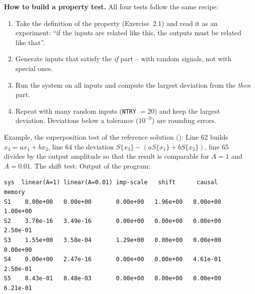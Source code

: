 \begin{solution}
\textbf{How to build a property test.} All four tests follow the same
recipe:
\begin{enumerate}[label=Step \arabic*:,leftmargin=*,itemsep=1pt]
  \item Take the definition of the property (Exercise~2.1) and read it as an
    experiment: ``if the inputs are related like this, the outputs must be
    related like that''.
  \item Generate inputs that satisfy the \emph{if} part -- with random
    signals, not with special ones.
  \item Run the system on all inputs and compute the largest deviation from
    the \emph{then} part.
  \item Repeat with many random inputs (\texttt{NTRY} $=20$) and keep the
    largest deviation. Deviations below a tolerance ($10^{-9}$) are rounding
    errors.
\end{enumerate}
Example, the superposition test of the reference solution
():
Line 62 builds $x_3=ax_1+bx_2$, line 64 the deviation
$S\{x_3\}-(aS\{x_1\}+bS\{x_2\})$, line 65 divides by the output amplitude so
that the result is comparable for $A=1$ and $A=0.01$. The shift test:
Output of the program:
\begin{lstlisting}[style=shell,numbers=none]
sys  linear(A=1) linear(A=0.01) imp-scale   shift      causal     memory
S1    0.00e+00   0.00e+00       0.00e+00   1.96e+00   0.00e+00   1.00e+00
S2    3.78e-16   3.49e-16       0.00e+00   0.00e+00   0.00e+00   2.50e-01
S3    1.55e+00   3.58e-04       1.29e+00   0.00e+00   0.00e+00   0.00e+00
S4    0.00e+00   2.47e-16       0.00e+00   0.00e+00   4.61e-01   2.50e-01
S5    8.43e-01   8.48e-03       0.00e+00   0.00e+00   0.00e+00   6.21e-01


\end{lstlisting}
\end{solution}
